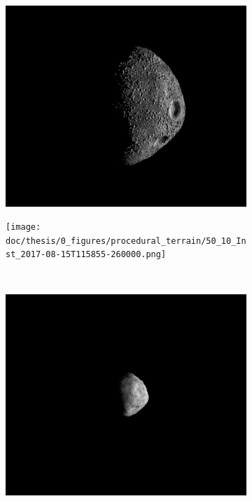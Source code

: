 \begin{figure}[htb]
    \centering
    \begin{subfigure}[b]{0.48\textwidth}
        \centering
        \includegraphics[width=\textwidth]{doc/thesis/0_figures/procedural_terrain/50_10_Inst_2017-08-15T115755-845000.png}
        \caption{}
        \label{fig:render_quali_comparison_1}
    \end{subfigure}
    \begin{subfigure}[b]{0.48\textwidth}
        \centering
        \texttt{[image: doc/thesis/0\_figures/procedural\_terrain/50\_10\_Inst\_2017-08-15T115855-260000.png]}
        \caption{}
        \label{fig:render_quali_comparison_2}
    \end{subfigure}
    \\
    \begin{subfigure}[b]{0.48\textwidth}
        \centering
        \includegraphics[width=\textwidth]{doc/thesis/0_figures/procedural_terrain/50_1_Inst_2017-08-15T115837-133000.png}

\end{subfigure}
\end{figure}
